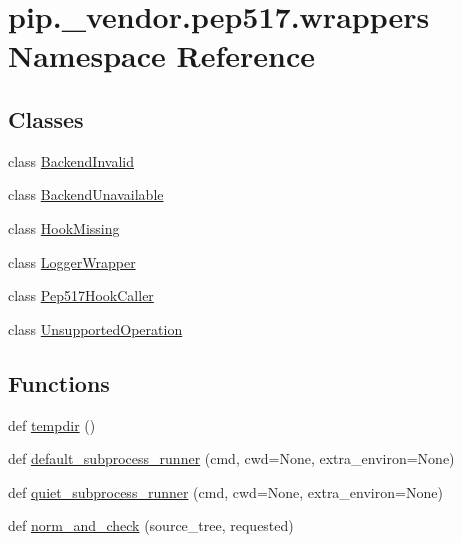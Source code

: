 \hypertarget{namespacepip_1_1__vendor_1_1pep517_1_1wrappers}{}\section{pip.\+\_\+vendor.\+pep517.\+wrappers Namespace Reference}
\label{namespacepip_1_1__vendor_1_1pep517_1_1wrappers}
\subsection*{Classes}
\begin{DoxyCompactItemize}
\item 
class \hyperlink{classpip_1_1__vendor_1_1pep517_1_1wrappers_1_1BackendInvalid}{Backend\+Invalid}
\item 
class \hyperlink{classpip_1_1__vendor_1_1pep517_1_1wrappers_1_1BackendUnavailable}{Backend\+Unavailable}
\item 
class \hyperlink{classpip_1_1__vendor_1_1pep517_1_1wrappers_1_1HookMissing}{Hook\+Missing}
\item 
class \hyperlink{classpip_1_1__vendor_1_1pep517_1_1wrappers_1_1LoggerWrapper}{Logger\+Wrapper}
\item 
class \hyperlink{classpip_1_1__vendor_1_1pep517_1_1wrappers_1_1Pep517HookCaller}{Pep517\+Hook\+Caller}
\item 
class \hyperlink{classpip_1_1__vendor_1_1pep517_1_1wrappers_1_1UnsupportedOperation}{Unsupported\+Operation}
\end{DoxyCompactItemize}
\subsection*{Functions}
\begin{DoxyCompactItemize}
\item 
def \hyperlink{namespacepip_1_1__vendor_1_1pep517_1_1wrappers_a72a2439d5dd78f24fc642bc33542528c}{tempdir} ()
\item 
def \hyperlink{namespacepip_1_1__vendor_1_1pep517_1_1wrappers_a3ef0c37471ef2d4cf3f8785181fb612a}{default\+\_\+subprocess\+\_\+runner} (cmd, cwd=None, extra\+\_\+environ=None)
\item 
def \hyperlink{namespacepip_1_1__vendor_1_1pep517_1_1wrappers_a1689b35b066adc0bf1134063047e5376}{quiet\+\_\+subprocess\+\_\+runner} (cmd, cwd=None, extra\+\_\+environ=None)
\item 
def \hyperlink{namespacepip_1_1__vendor_1_1pep517_1_1wrappers_a83ac74f6c71d771d200d6fc8da57db83}{norm\+\_\+and\+\_\+check} (source\+\_\+tree, requested)
\end{DoxyCompactItemize}



